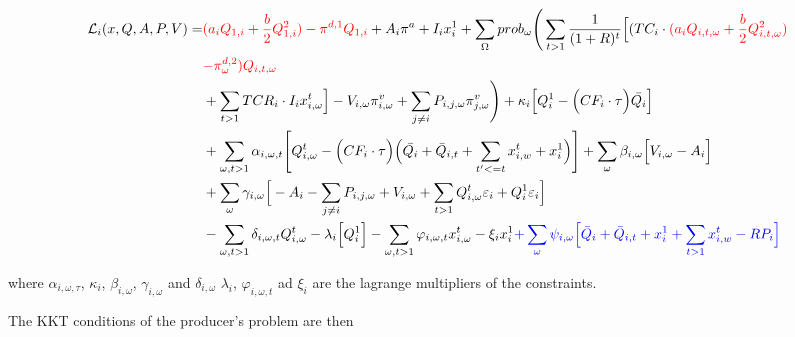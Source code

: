 \documentclass[11pt, letterpaper]{article}
\begin{document}
\begin{align}
    \mathcal{L}_i(x,Q,A,P,V) = &  {\color{red}(a_iQ_{1,i}+\frac{b}{2}Q_{1,i}^{2})-\pi^{d,1} Q_{1,i}}  + A_i \pi^{a} + I_i x_i^{1}  + \sum_{\Omega} prob_\omega  \Bigg( \sum_{t>1} \frac{1}{(1+R)^t} \Big[ (TC_{i}\cdot {\color{red}(a_iQ_{i,t,\omega}+\frac{b}{2}Q_{i,t,\omega}^{2})}\nonumber \\
    & {\color{red}-\pi^{d,2}_{\omega}) Q_{i,t,\omega}} \nonumber \\
    & + \sum_{t > 1} TCR_i \cdot I_ix^{t}_{i,\omega} \Big]  - V_{i,\omega}\pi_{i,\omega}^v+\sum_{j\neq i}  P_{i,j,\omega}\pi_{j,\omega}^v\Bigg) + \kappa_{i}\Big[Q_{i}^{1} -  \Big(CF_i\cdot\tau \Big)\bar{Q_i}\Big] \nonumber \\ 
   &  +\sum_{\omega,t>1} \alpha_{i,\omega,t}\Bigg[Q_{i,\omega}^{t} - \Big(CF_i \cdot\tau\Big) \Big(\bar{Q_i} +\bar{Q}_{i,t}+ \sum_{t^{\prime}<= t } x^{t}_{i,w} + x_i^{1} \Big)\Bigg]  + \sum_{\omega}\beta_{i,\omega}\Big[V_{i,\omega}-A_i\Big]  \nonumber \\
   & + \sum_{\omega}\gamma_{i,\omega} \Big[-A_{i} - \sum_{j \neq i}P_{i,j,\omega} + V_{i,\omega}+\sum_{t>1}Q_{i, \omega}^{t}\varepsilon_{i}+Q_i^{1}\varepsilon_{i}\Big] \nonumber\\
     & - \sum_{\omega, t>1}\delta_{i,\omega,t} Q_{i,\omega}^{t} - \lambda_{i}\Big[Q^{1}_{i}\Big] - \sum_{\omega, t>1}\varphi_{i,\omega,t} x_{i,\omega}^{t} - \xi_i x^{1}_i {\color{blue} + \sum_{\omega}\psi_{i,\omega} \Big[  \bar{Q}_i+\bar{Q}_{i,t} + x^{1}_i + \sum_{t > 1} x^{t}_{i,w} - RP_i \Big]}
\end{align}



where $\alpha_{i,\omega,\tau}$, $\kappa_i$, $\beta_{i,\omega}$, $\gamma_{i,\omega}$ and $\delta_{i,\omega}$  $\lambda_i$, $\varphi_{i,\omega,t}$ ad $\xi_i$ are the lagrange multipliers of the constraints. \newline

The KKT conditions of the producer's problem are then
\end{document}
